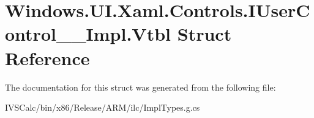 \hypertarget{struct_windows_1_1_u_i_1_1_xaml_1_1_controls_1_1_i_user_control_____impl_1_1_vtbl}{}\section{Windows.\+U\+I.\+Xaml.\+Controls.\+I\+User\+Control\+\_\+\+\_\+\+Impl.\+Vtbl Struct Reference}
\label{struct_windows_1_1_u_i_1_1_xaml_1_1_controls_1_1_i_user_control_____impl_1_1_vtbl}


The documentation for this struct was generated from the following file\+:\begin{DoxyCompactItemize}
\item 
I\+V\+S\+Calc/bin/x86/\+Release/\+A\+R\+M/ilc/Impl\+Types.\+g.\+cs\end{DoxyCompactItemize}
